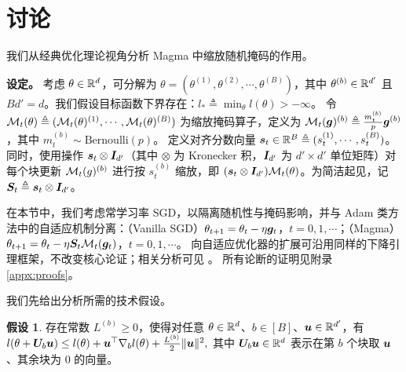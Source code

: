 \documentclass[11pt, a4paper, twocolumn, copyright, goog]{google}
\theoremstyle{plain}
\theoremstyle{definition}
\newtheorem{assumption}[theorem]{假设}
\theoremstyle{remark}
\begin{document}
\section{讨论} \label{sec:convergence_analysis}
我们从经典优化理论视角分析 Magma 中缩放随机掩码的作用。 

\textbf{设定。}
考虑 $\theta \in \mathbb{R}^d$，可分解为 $\theta = (\theta^{(1)}, \theta^{(2)}, \cdots, \theta^{(B)})$，其中 $\theta^{(b)} \in \mathbb{R}^{d'}$ 且 $B d' = d$。我们假设目标函数下界存在：$l_* \triangleq \min_\theta l(\theta) > - \infty$。 
令 ${\mathcal{M}}_t(\theta) \triangleq ({\mathcal{M}}_t(\theta)^{(1)}, \cdots, {\mathcal{M}}_t(\theta)^{(B)})$ 为缩放掩码算子，定义为 ${\mathcal{M}}_t({\bm{g}})^{(b)} \triangleq \frac{m_{t}^{(b)}}{p} {\bm{g}}^{(b)}$，其中 $m_{t}^{(b)} \sim \mathrm{Bernoulli}(p)$。 
定义对齐分数向量 ${\bm{s}}_t \in \mathbb{R}^B \triangleq (s_t^{(1)}, \cdots, s_t^{(B)})$。同时，使用操作 $ {\bm{s}}_t \otimes {\bm{I}}_{d'}$（其中 $\otimes$ 为 Kronecker 积，${\bm{I}}_{d'}$ 为 $d' \times d'$ 单位矩阵）对每个块更新 ${\mathcal{M}}_t(g)^{(b)}$ 进行按 $s_t^{(b)}$ 缩放，即 $({\bm{s}}_t \otimes {\bm{I}}_{d'}) {\mathcal{M}}_t(\theta)$。为简洁起见，记 ${\bm{S}}_t \triangleq {\bm{s}}_t \otimes {\bm{I}}_{d'}$。

在本节中，我们考虑常学习率 SGD，以隔离随机性与掩码影响，并与 Adam 类方法中的自适应机制分离：（Vanilla SGD）$\theta_{t+1} = \theta_t - \eta {\bm{g}}_t$，$t = 0, 1, \cdots$；（Magma）$\theta_{t+1} = \theta_t - \eta {\bm{S}}_t {\mathcal{M}}_t({\bm{g}}_t)$，$t = 0, 1, \cdots$。
向自适应优化器的扩展可沿用同样的下降引理框架，不改变核心论证；相关分析可见 \citet{wang2022divergence,crawshaw2022robustness}。
所有论断的证明见附录 \ref{appx:proofs}。





我们先给出分析所需的技术假设。


\begin{assumption} \label{assumption:layerwise_smooth}
    存在常数 $L^{(b)} \geq 0$，使得对任意 $\theta \in \mathbb{R}^d$、$b \in [B]$、${\bm{u}} \in \mathbb{R}^{d'}$，有 $l(\theta + {\bm{U}}_b {\bm{u}}) \leq l(\theta) + {\bm{u}}^\top \nabla_b l(\theta) + \frac{L^{(b)}}{2} \| {\bm{u}}  \|^2,$
    其中 ${\bm{U}}_b {\bm{u}} \in \mathbb{R}^d$ 表示在第 $b$ 个块取 ${\bm{u}}$、其余块为 0 的向量。  
\end{assumption}
\end{document}
